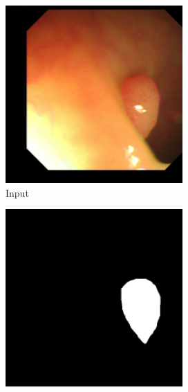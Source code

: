 \begin{figure}
	\centering
	\begin{subfigure}{.19\textwidth}
		\centering
		\includegraphics[width=.9\linewidth]{img/results/b03_input}
		\caption{Input}
	\end{subfigure}
	\begin{subfigure}{.19\textwidth}
		\centering
		\includegraphics[width=.9\linewidth]{img/results/b03_target}

\end{subfigure}
\end{figure}
